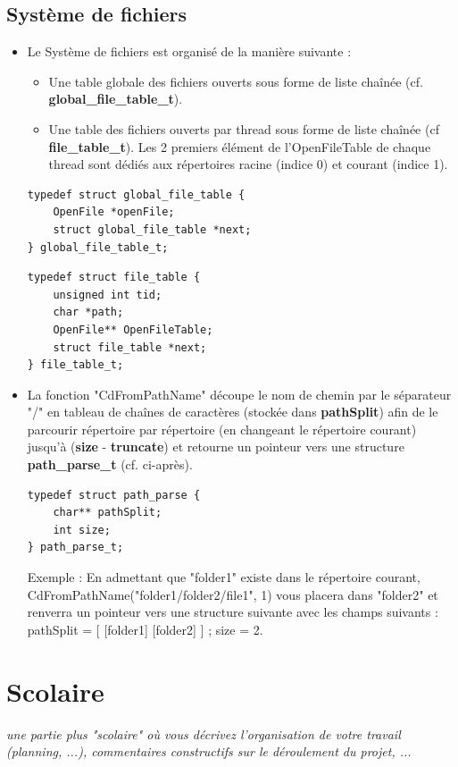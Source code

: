 \documentclass{article}
\begin{document}
\subsection{Système de fichiers}
\begin{itemize}
\item
Le Système de fichiers est organisé de la manière suivante :
\begin{itemize}
	\item
	Une table globale des fichiers ouverts sous forme de liste chaînée (cf.  \textbf{global\_file\_table\_t}).
	\item
	Une table des fichiers ouverts par thread sous forme de liste chaînée (cf \textbf{file\_table\_t}). Les 2 premiers élément de l'OpenFileTable de chaque thread sont dédiés aux répertoires racine (indice 0) et courant (indice 1).

\end{itemize}

 \begin{lstlisting}[frame=single]
typedef struct global_file_table {
    OpenFile *openFile;
    struct global_file_table *next;
} global_file_table_t;
  \end{lstlisting}

  \begin{lstlisting}[frame=single]
typedef struct file_table {
    unsigned int tid;
    char *path;
    OpenFile** OpenFileTable;
    struct file_table *next;
} file_table_t;
  \end{lstlisting}

 \item
La fonction "CdFromPathName"  découpe le nom de chemin par le séparateur "/" en tableau de chaînes de caractères (stockée dans \textbf{pathSplit}) afin de le parcourir répertoire par répertoire (en changeant le répertoire courant) jusqu'à (\textbf{size} - \textbf{truncate}) et retourne un pointeur vers une  structure \textbf{path\_parse\_t} (cf. ci-après).


  \begin{lstlisting}[frame=single]
  typedef struct path_parse {
    char** pathSplit;
    int size;
} path_parse_t;
  \end{lstlisting}

  Exemple :
  En admettant que "folder1" existe dans le répertoire courant, CdFromPathName("folder1/folder2/file1", 1) vous placera dans "folder2" et renverra un pointeur vers une structure suivante avec les champs suivants :
  pathSplit = [ [folder1] [folder2] ] ; size = 2.

 \end{itemize}

\section{Scolaire}
\textit{une partie plus "scolaire" où vous décrivez l'organisation de votre travail (planning, ...), commentaires constructifs sur le déroulement du projet, ...}
\vspace{5mm}
\end{document}

